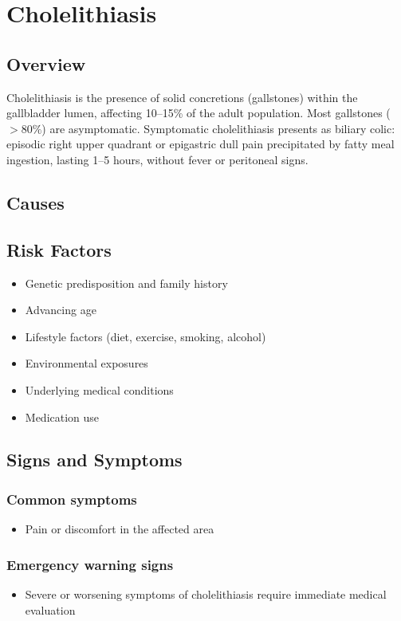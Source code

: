 \chapter{Cholelithiasis}
\label{sec:Cholelithiasis}

\section{Overview}
Cholelithiasis is the presence of solid concretions (gallstones) within the gallbladder lumen, affecting 10--15\% of the adult population. Most gallstones ($>80\%$) are asymptomatic. Symptomatic cholelithiasis presents as biliary colic: episodic right upper quadrant or epigastric dull pain precipitated by fatty meal ingestion, lasting 1--5 hours, without fever or peritoneal signs.
\section{Causes}
\section{Risk Factors}

\begin{itemize}[noitemsep]
  \item Genetic predisposition and family history
  \item Advancing age
  \item Lifestyle factors (diet, exercise, smoking, alcohol)
  \item Environmental exposures
  \item Underlying medical conditions
  \item Medication use
\end{itemize}
\section{Signs and Symptoms}

\subsection{Common symptoms}
\begin{itemize}[noitemsep]
  \item Pain or discomfort in the affected area
  \end{itemize}

\subsection{Emergency warning signs}
\begin{itemize}[noitemsep]
  \item Severe or worsening symptoms of cholelithiasis require immediate medical evaluation
\end{itemize}
